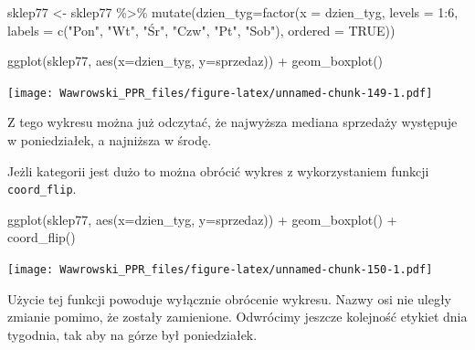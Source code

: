 \documentclass[
]{book}
\newenvironment{Shaded}{\begin{snugshade}}{\end{snugshade}}
\newcommand{\AttributeTok}[1]{\textcolor[rgb]{0.77,0.63,0.00}{#1}}
\newcommand{\ConstantTok}[1]{\textcolor[rgb]{0.00,0.00,0.00}{#1}}
\newcommand{\DecValTok}[1]{\textcolor[rgb]{0.00,0.00,0.81}{#1}}
\newcommand{\FunctionTok}[1]{\textcolor[rgb]{0.00,0.00,0.00}{#1}}
\newcommand{\NormalTok}[1]{#1}
\newcommand{\OtherTok}[1]{\textcolor[rgb]{0.56,0.35,0.01}{#1}}
\newcommand{\SpecialCharTok}[1]{\textcolor[rgb]{0.00,0.00,0.00}{#1}}
\newcommand{\StringTok}[1]{\textcolor[rgb]{0.31,0.60,0.02}{#1}}
\begin{document}
\begin{Shaded}
\begin{Highlighting}[]
\NormalTok{sklep77 }\OtherTok{\textless{}{-}}\NormalTok{ sklep77 }\SpecialCharTok{\%\textgreater{}\%}
  \FunctionTok{mutate}\NormalTok{(}\AttributeTok{dzien\_tyg=}\FunctionTok{factor}\NormalTok{(}\AttributeTok{x =}\NormalTok{ dzien\_tyg,}
                          \AttributeTok{levels =} \DecValTok{1}\SpecialCharTok{:}\DecValTok{6}\NormalTok{,}
                          \AttributeTok{labels =} \FunctionTok{c}\NormalTok{(}\StringTok{"Pon"}\NormalTok{, }\StringTok{"Wt"}\NormalTok{, }\StringTok{"Śr"}\NormalTok{, }\StringTok{"Czw"}\NormalTok{, }\StringTok{"Pt"}\NormalTok{, }\StringTok{"Sob"}\NormalTok{),}
                          \AttributeTok{ordered =} \ConstantTok{TRUE}\NormalTok{))}

\FunctionTok{ggplot}\NormalTok{(sklep77, }\FunctionTok{aes}\NormalTok{(}\AttributeTok{x=}\NormalTok{dzien\_tyg, }\AttributeTok{y=}\NormalTok{sprzedaz)) }\SpecialCharTok{+}
  \FunctionTok{geom\_boxplot}\NormalTok{() }
\end{Highlighting}
\end{Shaded}

\texttt{[image: Wawrowski\_PPR\_files/figure-latex/unnamed-chunk-149-1.pdf]}

Z tego wykresu można już odczytać, że najwyższa mediana sprzedaży występuje w poniedziałek, a najniższa w środę.

Jeżli kategorii jest dużo to można obrócić wykres z wykorzystaniem funkcji \texttt{coord\_flip}.

\begin{Shaded}
\begin{Highlighting}[]
\FunctionTok{ggplot}\NormalTok{(sklep77, }\FunctionTok{aes}\NormalTok{(}\AttributeTok{x=}\NormalTok{dzien\_tyg, }\AttributeTok{y=}\NormalTok{sprzedaz)) }\SpecialCharTok{+}
  \FunctionTok{geom\_boxplot}\NormalTok{() }\SpecialCharTok{+}
  \FunctionTok{coord\_flip}\NormalTok{()}
\end{Highlighting}
\end{Shaded}

\texttt{[image: Wawrowski\_PPR\_files/figure-latex/unnamed-chunk-150-1.pdf]}

Użycie tej funkcji powoduje wyłącznie obrócenie wykresu. Nazwy osi nie uległy zmianie pomimo, że zostały zamienione.
Odwrócimy jeszcze kolejność etykiet dnia tygodnia, tak aby na górze był poniedziałek.

\begin{Shaded}
\end{Shaded}
\end{document}
